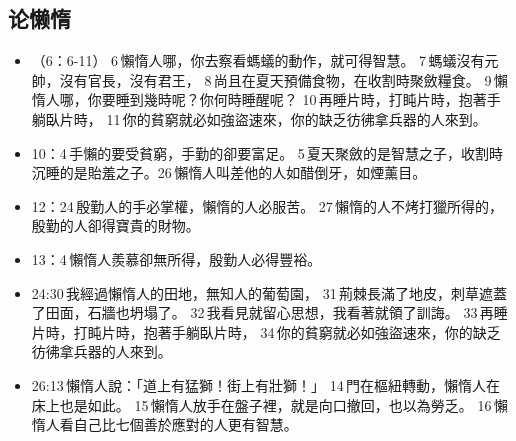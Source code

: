 \subsection{论懒惰}
\begin{itemize}
\itemsep-.45em 
\item （6：6-11） 6 懶惰人哪，你去察看螞蟻的動作，就可得智慧。 7 螞蟻沒有元帥，沒有官長，沒有君王， 8 尚且在夏天預備食物，在收割時聚斂糧食。 9 懶惰人哪，你要睡到幾時呢？你何時睡醒呢？ 10 再睡片時，打盹片時，抱著手躺臥片時， 11 你的貧窮就必如強盜速來，你的缺乏彷彿拿兵器的人來到。
\item 10：4 手懶的要受貧窮，手勤的卻要富足。 5 夏天聚斂的是智慧之子，收割時沉睡的是貽羞之子。26 懶惰人叫差他的人如醋倒牙，如煙薰目。
\item 12：24 殷勤人的手必掌權，懶惰的人必服苦。 27 懶惰的人不烤打獵所得的，殷勤的人卻得寶貴的財物。
\item 13：4 懶惰人羨慕卻無所得，殷勤人必得豐裕。
\item 24:30 我經過懶惰人的田地，無知人的葡萄園， 31 荊棘長滿了地皮，刺草遮蓋了田面，石牆也坍塌了。 32 我看見就留心思想，我看著就領了訓誨。 33 再睡片時，打盹片時，抱著手躺臥片時， 34 你的貧窮就必如強盜速來，你的缺乏彷彿拿兵器的人來到。
\item 26:13 懶惰人說：「道上有猛獅！街上有壯獅！」 14 門在樞紐轉動，懶惰人在床上也是如此。 15 懶惰人放手在盤子裡，就是向口撤回，也以為勞乏。 16 懶惰人看自己比七個善於應對的人更有智慧。
\end{itemize}


